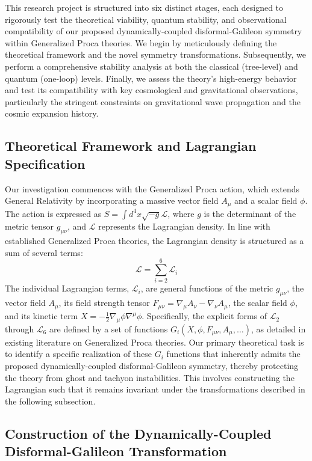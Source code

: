 \documentclass[twocolumn]{aastex631}
\begin{document}
This research project is structured into six distinct stages, each designed to rigorously test the theoretical viability, quantum stability, and observational compatibility of our proposed dynamically-coupled disformal-Galileon symmetry within Generalized Proca theories. We begin by meticulously defining the theoretical framework and the novel symmetry transformations. Subsequently, we perform a comprehensive stability analysis at both the classical (tree-level) and quantum (one-loop) levels. Finally, we assess the theory's high-energy behavior and test its compatibility with key cosmological and gravitational observations, particularly the stringent constraints on gravitational wave propagation and the cosmic expansion history.

\subsection{Theoretical Framework and Lagrangian Specification}

Our investigation commences with the Generalized Proca action, which extends General Relativity by incorporating a massive vector field $A_\mu$ and a scalar field $\phi$. The action is expressed as $S = \int d^4x \sqrt{-g} \mathcal{L}$, where $g$ is the determinant of the metric tensor $g_{\mu\nu}$, and $\mathcal{L}$ represents the Lagrangian density. In line with established Generalized Proca theories, the Lagrangian density is structured as a sum of several terms:
$$
\mathcal{L} = \sum_{i=2}^{6} \mathcal{L}_i
$$
The individual Lagrangian terms, $\mathcal{L}_i$, are general functions of the metric $g_{\mu\nu}$, the vector field $A_\mu$, its field strength tensor $F_{\mu\nu} = \nabla_\mu A_\nu - \nabla_\nu A_\mu$, the scalar field $\phi$, and its kinetic term $X = -\frac{1}{2} \nabla_\mu \phi \nabla^\mu \phi$. Specifically, the explicit forms of $\mathcal{L}_2$ through $\mathcal{L}_6$ are defined by a set of functions $G_i(X, \phi, F_{\mu\nu}, A_\mu, \dots)$, as detailed in existing literature on Generalized Proca theories. Our primary theoretical task is to identify a specific realization of these $G_i$ functions that inherently admits the proposed dynamically-coupled disformal-Galileon symmetry, thereby protecting the theory from ghost and tachyon instabilities. This involves constructing the Lagrangian such that it remains invariant under the transformations described in the following subsection.

\subsection{Construction of the Dynamically-Coupled Disformal-Galileon Transformation}
\end{document}
